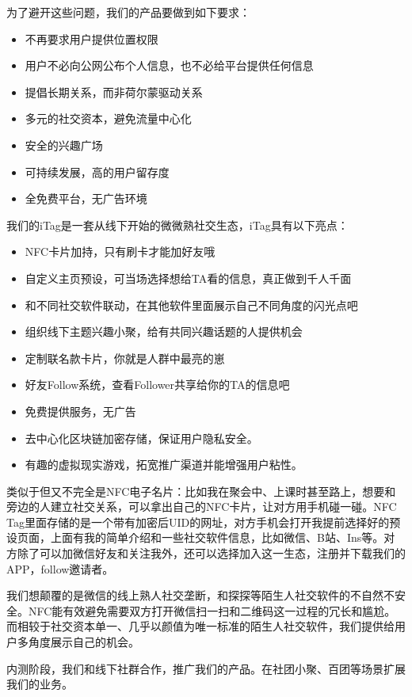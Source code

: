 \documentclass[UTF8]{ctexart}
\begin{document}
为了避开这些问题，我们的产品要做到如下要求：

\begin{itemize}
    \item 不再要求用户提供位置权限
    \item 用户不必向公网公布个人信息，也不必给平台提供任何信息
    \item 提倡长期关系，而非荷尔蒙驱动关系
    \item 多元的社交资本，避免流量中心化
    \item 安全的兴趣广场
    \item 可持续发展，高的用户留存度
    \item 全免费平台，无广告环境
\end{itemize}

我们的iTag是一套从线下开始的微微熟社交生态，iTag具有以下亮点：

\begin{itemize}
    \item NFC卡片加持，只有刷卡才能加好友哦
    \item 自定义主页预设，可当场选择想给TA看的信息，真正做到千人千面
    \item 和不同社交软件联动，在其他软件里面展示自己不同角度的闪光点吧
    \item 组织线下主题兴趣小聚，给有共同兴趣话题的人提供机会
    \item 定制联名款卡片，你就是人群中最亮的崽
    \item 好友Follow系统，查看Follower共享给你的TA的信息吧~
    \item 免费提供服务，无广告
    \item 去中心化区块链加密存储，保证用户隐私安全。
    \item 有趣的虚拟现实游戏，拓宽推广渠道并能增强用户粘性。
\end{itemize}

类似于但又不完全是NFC电子名片：比如我在聚会中、上课时甚至路上，想要和旁边的人建立社交关系，可以拿出自己的NFC卡片，让对方用手机碰一碰。NFC Tag里面存储的是一个带有加密后UID的网址，对方手机会打开我提前选择好的预设页面，上面有我的简单介绍和一些社交软件信息，比如微信、B站、Ins等。对方除了可以加微信好友和关注我外，还可以选择加入这一生态，注册并下载我们的APP，follow邀请者。

我们想颠覆的是微信的线上熟人社交垄断，和探探等陌生人社交软件的不自然不安全。NFC能有效避免需要双方打开微信扫一扫和二维码这一过程的冗长和尴尬。而相较于社交资本单一、几乎以颜值为唯一标准的陌生人社交软件，我们提供给用户多角度展示自己的机会。

内测阶段，我们和线下社群合作，推广我们的产品。在社团小聚、百团等场景扩展我们的业务。
\end{document}
